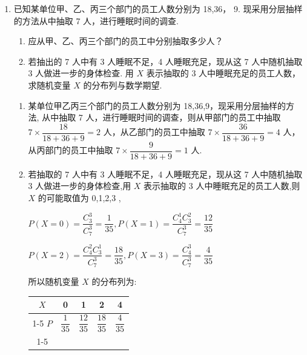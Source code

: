 \begin{enumerate}
\begin{enumerate}
\begin{jieda}
\begin{enumerate}
                故 $E\left( X\right)  = 0 + \dfrac{5}{12} + \dfrac{8}{12} + \dfrac{3}{12} = \dfrac{16}{12} = \dfrac{4}{3}$ .
            \end{enumerate}
        \end{jieda}
        \item 已知某单位甲、乙、丙三个部门的员工人数分别为 18,36， 9. 现采用分层抽样的方法从中抽取 7 人，进行睡眠时间的调查.
        \begin{enumerate}
            \item 应从甲、乙、丙三个部门的员工中分别抽取多少人？
            \item 若抽出的 7 人中有 3 人睡眠不足，4 人睡眠充足，现从这 7 人中随机抽取 3 人做进一步的身体检查. 用 $X$ 表示抽取的 3 人中睡眠充足的员工人数，求随机变量 $X$ 的分布列与数学期望.
        \end{enumerate}
        \begin{jieda}
            \begin{enumerate}
                \item 某单位甲乙丙三个部门的员工人数分别为 18,36,9，现采用分层抽样的方法, 从中抽取 7 人，进行睡眠时间的调查，则从甲部门的员工中抽取 $7 \times  \dfrac{18}{{18} + {36} + 9} = 2$ 人，从乙部门的员工中抽取 $7 \times  \dfrac{36}{{18} + {36} + 9} = 4$ 人，从丙部门的员工中抽取 $7 \times  \dfrac{9}{{18} + {36} + 9} = 1$ 人.
                \item 若抽取的 7 人中有 3 人睡眠不足，4 人睡眠充足，现从这 7 人中随机抽取 3 人做进一步的身体检查,用 $X$ 表示抽取的 3 人中睡眠充足的员工人数,则 $X$ 的可能取值为 0,1,2,3 ,
                
                $P\left( {X = 0}\right)  = \dfrac{C_{3}^{3}}{C_7^{3}} = \dfrac{1}{35},P\left( {X = 1}\right)  = \dfrac{C_{4}^{1}C_{3}^{2}}{C_7^{3}} = \dfrac{12}{35}$
                
                $P\left( {X = 2}\right)  = \dfrac{C_{4}^{2}C_{3}^{1}}{C_7^{3}} = \dfrac{18}{35},P\left( {X = 3}\right)  = \dfrac{C_{4}^{3}}{C_7^{3}} = \dfrac{4}{35}$
                
                所以随机变量 $X$ 的分布列为:
                
                \begin{center}
                
                \begin{tabular}{|c|c|c|c|c|}
                \hline
                $X$ & 0 & 1 & 2 & 4 \\
                \cline{1-5}
                $P$ & $\dfrac{1}{35}$ & $\dfrac{12}{35}$ & $\dfrac{18}{35}$ & $\dfrac{4}{35}$ \\
                \cline{1-5}
                \hline
                \end{tabular}
                

\end{center}
\end{enumerate}
\end{jieda}
\end{enumerate}
\end{enumerate}
